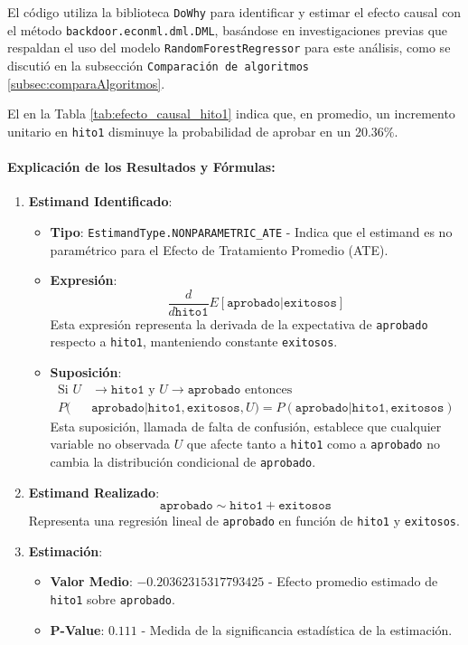 El código utiliza la biblioteca \texttt{DoWhy} para identificar y estimar el efecto causal con el método \texttt{backdoor.econml.dml.DML}, basándose en investigaciones previas que respaldan el uso del modelo \texttt{RandomForestRegressor} para este análisis, como se discutió en la subsección \texttt{Comparación de algoritmos} \ref{subsec:comparaAlgoritmos}.

El  en la Tabla \ref{tab:efecto_causal_hito1} indica que, en promedio, un incremento unitario en \texttt{hito1} disminuye la probabilidad de aprobar en un \(20.36\% \).

\paragraph{Explicación de los Resultados y Fórmulas:}

\begin{enumerate}
    \item \textbf{Estimand Identificado}:
    \begin{itemize}
        \item \textbf{Tipo}: \texttt{EstimandType.NONPARAMETRIC\_ATE} - Indica que el estimand es no paramétrico para el Efecto de Tratamiento Promedio (ATE).
        \item \textbf{Expresión}:
        \[
        \frac{d}{d\texttt{hito1}}E[\texttt{aprobado}|\texttt{exitosos}]
        \]
        Esta expresión representa la derivada de la expectativa de \texttt{aprobado} respecto a \texttt{hito1}, manteniendo constante \texttt{exitosos}.
        
        \item \textbf{Suposición}:
        \begin{align}
            \text{Si } U &\rightarrow \texttt{hito1} \text{ y } U \rightarrow \texttt{aprobado} \text{ entonces } \nonumber \\
            P(&\texttt{aprobado}|\texttt{hito1},\texttt{exitosos},U) = P(\texttt{aprobado}|\texttt{hito1},\texttt{exitosos})
        \end{align}
        Esta suposición, llamada de falta de confusión, establece que cualquier variable no observada \( U \) que afecte tanto a \texttt{hito1} como a \texttt{aprobado} no cambia la distribución condicional de \texttt{aprobado}.
    \end{itemize}
    
    \item \textbf{Estimand Realizado}:
    \[ 
    \texttt{aprobado} \sim \texttt{hito1} + \texttt{exitosos}
    \]
    Representa una regresión lineal de \texttt{aprobado} en función de \texttt{hito1} y \texttt{exitosos}.
    
    \item \textbf{Estimación}:
    \begin{itemize}
        \item \textbf{Valor Medio}: \( -0.20362315317793425 \) - Efecto promedio estimado de \texttt{hito1} sobre \texttt{aprobado}.
        \item \textbf{P-Value}: \( 0.111 \) - Medida de la significancia estadística de la estimación.
    \end{itemize}
\end{enumerate}

